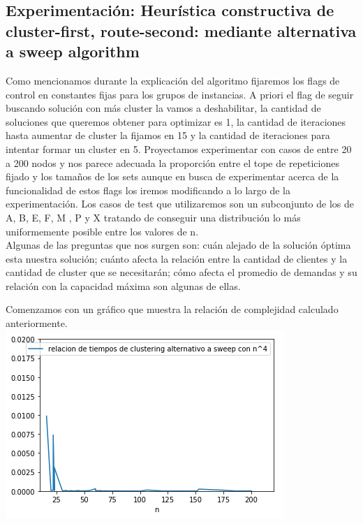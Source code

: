 \documentclass[11pt,a4paper]{article}
\begin{document}
\subsection{Experimentación: Heurística constructiva de cluster-first, route-second: mediante alternativa a sweep algorithm}
Como mencionamos durante la explicación del algoritmo fijaremos los flags de control en constantes fijas para los grupos de instancias. A priori el flag de seguir buscando solución con más cluster la vamos a deshabilitar, la cantidad de soluciones que queremos obtener para optimizar es 1, la cantidad de iteraciones hasta aumentar de cluster la fijamos en 15 y la cantidad de iteraciones para intentar formar un cluster en 5. Proyectamos experimentar con casos de entre 20 a 200 nodos y nos parece adecuada la proporción entre el tope de repeticiones fijado y los tamaños de los sets aunque en busca de experimentar acerca de la funcionalidad de estos flags los iremos modificando a lo largo de la experimentación. Los casos de test que utilizaremos son un subconjunto de los de A, B, E, F, M , P y X tratando de conseguir una distribución lo más uniformemente posible entre los valores de n.\\

Algunas de las preguntas que nos surgen son: cuán alejado de la solución óptima esta nuestra solución; cuánto afecta la relación entre la cantidad de clientes y la cantidad de cluster que se necesitarán; cómo afecta el promedio de demandas y su relación con la capacidad máxima son algunas de ellas.

Comenzamos con un gráfico que muestra la relación de complejidad calculado anteriormente.\\
\center
\includegraphics[scale=0.8]{graf/comparativa_complejidad.png}
\end{document}
